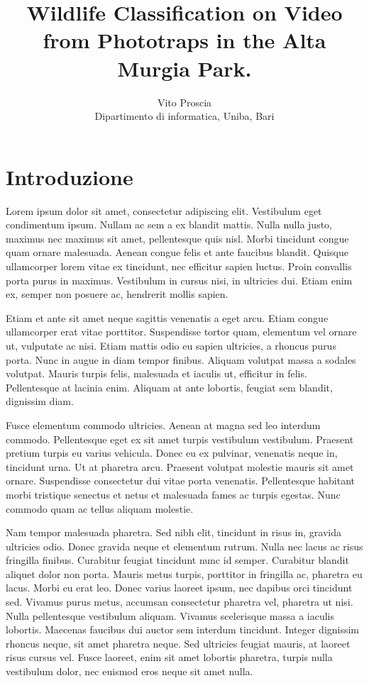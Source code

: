\documentclass[10pt,twocolumn]{article}
\title{\bfseries Wildlife Classification on Video from Phototraps in the Alta Murgia Park.}
\author{
	Vito Proscia \href{v.proscia3@studenti.uniba.it}{\textsuperscript{\Letter}} \\
	\small Dipartimento di informatica, Uniba, Bari
}
\date{}
\begin{document}
	
	
	\section{Introduzione}
	
	
	Lorem ipsum dolor sit amet, consectetur adipiscing elit. Vestibulum eget condimentum ipsum. Nullam ac sem a ex blandit mattis. Nulla nulla justo, maximus nec maximus sit amet, pellentesque quis nisl. Morbi tincidunt congue quam ornare malesuada. Aenean congue felis et ante faucibus blandit. Quisque ullamcorper lorem vitae ex tincidunt, nec efficitur sapien luctus. Proin convallis porta purus in maximus. Vestibulum in cursus nisi, in ultricies dui. Etiam enim ex, semper non posuere ac, hendrerit mollis sapien.
	
	Etiam et ante sit amet neque sagittis venenatis a eget arcu. Etiam congue ullamcorper erat vitae porttitor. Suspendisse tortor quam, elementum vel ornare ut, vulputate ac nisi. Etiam mattis odio eu sapien ultricies, a rhoncus purus porta. Nunc in augue in diam tempor finibus. Aliquam volutpat massa a sodales volutpat. Mauris turpis felis, malesuada et iaculis ut, efficitur in felis. Pellentesque at lacinia enim. Aliquam at ante lobortis, feugiat sem blandit, dignissim diam.
	
	Fusce elementum commodo ultricies. Aenean at magna sed leo interdum commodo. Pellentesque eget ex sit amet turpis vestibulum vestibulum. Praesent pretium turpis eu varius vehicula. Donec eu ex pulvinar, venenatis neque in, tincidunt urna. Ut at pharetra arcu. Praesent volutpat molestie mauris sit amet ornare. Suspendisse consectetur dui vitae porta venenatis. Pellentesque habitant morbi tristique senectus et netus et malesuada fames ac turpis egestas. Nunc commodo quam ac tellus aliquam molestie.
	
	Nam tempor malesuada pharetra. Sed nibh elit, tincidunt in risus in, gravida ultricies odio. Donec gravida neque et elementum rutrum. Nulla nec lacus ac risus fringilla finibus. Curabitur feugiat tincidunt nunc id semper. Curabitur blandit aliquet dolor non porta. Mauris metus turpis, porttitor in fringilla ac, pharetra eu lacus. Morbi eu erat leo. Donec varius laoreet ipsum, nec dapibus orci tincidunt sed. Vivamus purus metus, accumsan consectetur pharetra vel, pharetra ut nisi. Nulla pellentesque vestibulum aliquam. Vivamus scelerisque massa a iaculis lobortis. Maecenas faucibus dui auctor sem interdum tincidunt. Integer dignissim rhoncus neque, sit amet pharetra neque. Sed ultricies feugiat mauris, at laoreet risus cursus vel. Fusce laoreet, enim sit amet lobortis pharetra, turpis nulla vestibulum dolor, nec euismod eros neque sit amet nulla.
	
\end{document}
